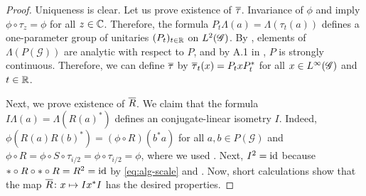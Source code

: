 \begin{proof}
  Uniqueness is clear.  Let us prove existence of $\overline{\tau}$.
  Invariance of $\phi$ and \cite[Theorem 2.25]{DCT1} imply $\phi \circ
  \tau_{z} = \phi$ for all $z\in \mathbb{C}$. Therefore, the formula
  $P_{t}\Lambda(a) = \Lambda(\tau_{t}(a))$ defines a one-parameter
  group of unitaries $(P_{t})_{t\in \mathbb{R}}$ on $L^{2}(\mathscr{G})$. By \cite[Theorem
  2.25]{DCT1}, elements of $\Lambda(P(\mathscr{G}))$ are analytic with
  respect to $P$, and by A.1 in \cite{Taksak2}, $P$ is strongly
  continuous.  Therefore, we can define $\overline{\tau}$ by  $\overline{\tau}_{t}(x)=
  P_{t}xP_{t}^{*}$ for all $x\in L^{\infty}(\mathscr{G})$ and $t\in \mathbb{R}$.
  

  Next, we prove existence of $\overline{R}$. We claim that the formula $
  I\Lambda(a) = \Lambda(R(a)^{*})$ defines an conjugate-linear
  isometry $I$. Indeed, $\phi(R(a)R(b)^{*})= (\phi\circ R)(b^{*}a)$
  for all $a,b\in P(\mathscr{G})$ and $\phi \circ R=\phi \circ S \circ
  \tau_{i/2} = \phi \circ \tau_{i/2}=\phi$, where we used \cite[
  Corollary 2.13]{DCT1}. Next, $I^{2} = \operatorname{id}$ because $*\circ R \circ *
  \circ R= R^{2}=\operatorname{id}$ by \eqref{eq:alg-scale} and \cite[Proposition 1.16]{DCT1}. Now, short calculations show that the map $\overline{R} \colon
  x \mapsto Ix^{*}I$ has the desired properties.


\end{proof}
